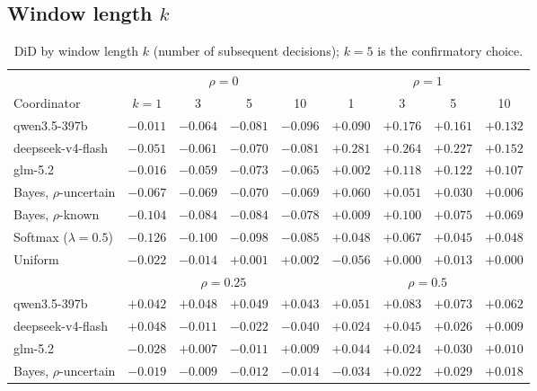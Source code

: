 \documentclass[11pt,letterpaper]{article}
\newcommand{\did}{\mathrm{DiD}}
\numberwithin{equation}{section}
\numberwithin{table}{section}
\numberwithin{figure}{section}
\numberwithin{algorithm}{section}
\begin{document}
\subsection{Window length $k$}

\begin{table}[h]
\centering\small
\caption{$\did$ by window length $k$ (number of subsequent decisions); $k=5$ is the confirmatory choice.}
\label{tab:k}
\begin{adjustbox}{max width=\linewidth}
\begin{tabular}{lcccccccc}
\toprule
 & \multicolumn{4}{c}{$\rho=0$} & \multicolumn{4}{c}{$\rho=1$} \\
\cmidrule(lr){2-5}\cmidrule(lr){6-9}
Coordinator & $k=1$ & 3 & 5 & 10 & 1 & 3 & 5 & 10 \\
\midrule
qwen3.5-397b & $-0.011$ & $-0.064$ & $-0.081$ & $-0.096$ & $+0.090$ & $+0.176$ & $+0.161$ & $+0.132$ \\
deepseek-v4-flash & $-0.051$ & $-0.061$ & $-0.070$ & $-0.081$ & $+0.281$ & $+0.264$ & $+0.227$ & $+0.152$ \\
glm-5.2 & $-0.016$ & $-0.059$ & $-0.073$ & $-0.065$ & $+0.002$ & $+0.118$ & $+0.122$ & $+0.107$ \\
Bayes, $\rho$-uncertain & $-0.067$ & $-0.069$ & $-0.070$ & $-0.069$ & $+0.060$ & $+0.051$ & $+0.030$ & $+0.006$ \\
Bayes, $\rho$-known & $-0.104$ & $-0.084$ & $-0.084$ & $-0.078$ & $+0.009$ & $+0.100$ & $+0.075$ & $+0.069$ \\
Softmax ($\lambda=0.5$) & $-0.126$ & $-0.100$ & $-0.098$ & $-0.085$ & $+0.048$ & $+0.067$ & $+0.045$ & $+0.048$ \\
Uniform & $-0.022$ & $-0.014$ & $+0.001$ & $+0.002$ & $-0.056$ & $+0.000$ & $+0.013$ & $+0.000$ \\
\midrule
 & \multicolumn{4}{c}{$\rho=0.25$} & \multicolumn{4}{c}{$\rho=0.5$} \\
\cmidrule(lr){2-5}\cmidrule(lr){6-9}
qwen3.5-397b & $+0.042$ & $+0.048$ & $+0.049$ & $+0.043$ & $+0.051$ & $+0.083$ & $+0.073$ & $+0.062$ \\
deepseek-v4-flash & $+0.048$ & $-0.011$ & $-0.022$ & $-0.040$ & $+0.024$ & $+0.045$ & $+0.026$ & $+0.009$ \\
glm-5.2 & $-0.028$ & $+0.007$ & $-0.011$ & $+0.009$ & $+0.044$ & $+0.024$ & $+0.030$ & $+0.010$ \\
Bayes, $\rho$-uncertain & $-0.019$ & $-0.009$ & $-0.012$ & $-0.014$ & $-0.034$ & $+0.022$ & $+0.029$ & $+0.018$ \\
\bottomrule
\end{tabular}
\end{adjustbox}
\end{table}
\end{document}
